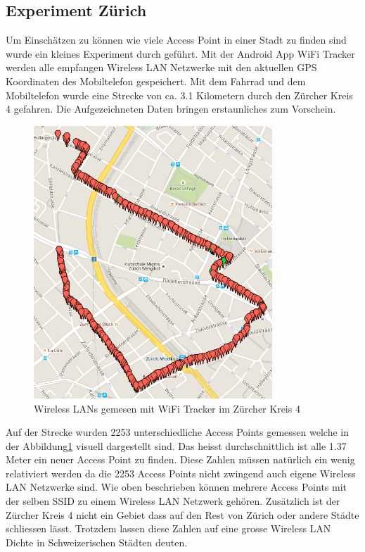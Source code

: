 \subsection{Experiment Zürich}
Um Einschätzen zu können wie viele Access Point in einer Stadt zu finden sind wurde ein kleines Experiment durch geführt. Mit der Android App WiFi Tracker\citep{google.play.wifitracker} werden alle empfangen Wireless LAN Netzwerke mit den aktuellen GPS Koordinaten des Mobiltelefon gespeichert. Mit dem Fahrrad und dem Mobiltelefon wurde eine Strecke von ca. 3.1 Kilometern durch den Zürcher Kreis 4 gefahren. Die Aufgezeichneten Daten bringen erstaunliches zum Vorschein.
\begin{figure}[ht]
	\centering
	\includegraphics[width=0.8\textwidth]{images/wifikreis4.png}
	\caption{Wireless LANs gemesen mit WiFi Tracker im Zürcher Kreis 4}
	\label{fig:wifikreis4}
\end{figure}
Auf der Strecke wurden 2253 unterschiedliche Access Points gemessen welche in der Abbildung\ref{fig:wifikreis4} visuell dargestellt sind. Das heisst durchschnittlich ist alle 1.37 Meter ein neuer Access Point zu finden. Diese Zahlen müssen natürlich ein wenig relativiert werden da die 2253 Access Points nicht zwingend auch eigene Wireless LAN Netzwerke sind. Wie oben beschrieben können mehrere Access Points mit der selben SSID zu einem Wireless LAN Netzwerk gehören. Zusätzlich ist der Zürcher Kreis 4 nicht ein Gebiet dass auf den Rest von Zürich oder andere Städte schliessen lässt. Trotzdem lassen diese Zahlen auf eine grosse Wireless LAN Dichte in Schweizerischen Städten deuten.


